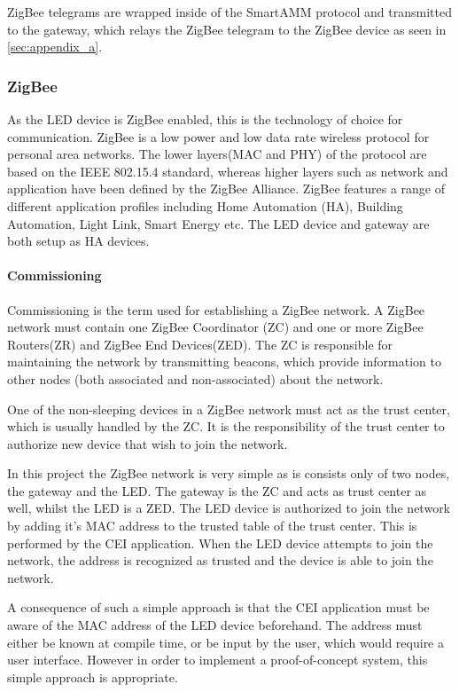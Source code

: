 \documentclass[Main]{subfiles}
\begin{document}
			ZigBee telegrams are wrapped inside of the SmartAMM protocol and transmitted to the gateway, which relays the ZigBee telegram to the ZigBee device as seen in \ref{sec:appendix_a}.


		\subsubsection{ZigBee}
			As the LED device is ZigBee enabled, this is the technology of choice for communication. 
			ZigBee is a low power and low data rate wireless protocol for personal area networks. 
			The lower layers(MAC and PHY) of the protocol are based on the IEEE 802.15.4 standard\cite{ZigBeeSpec}, whereas higher layers such as network and application have been defined by the ZigBee Alliance.
			ZigBee features a range of different application profiles including Home Automation (HA), Building Automation, Light Link, Smart Energy etc\cite{ZigBeeApplicationProfiles:Online}.
			The LED device and gateway are both setup as HA devices. 

			\paragraph{Commissioning} %
				Commissioning is the term used for establishing a ZigBee network.
				A ZigBee network must contain one ZigBee Coordinator (ZC) and one or more ZigBee Routers(ZR) and ZigBee End Devices(ZED). 
				The ZC is responsible for maintaining the network by transmitting beacons, which provide information to other nodes (both associated and non-associated) about the network.

				One of the non-sleeping devices in a ZigBee network must act as the trust center, which is usually handled by the ZC. 
				It is the responsibility of the trust center to authorize new device that wish to join the network.

				In this project the ZigBee network is very simple as is consists only of two nodes, the gateway and the LED. 
				The gateway is the ZC and acts as trust center as well, whilst the LED is a ZED.
				The LED device is authorized to join the network by adding it's MAC address to the trusted table of the trust center. 
				This is performed by the CEI application.
				When the LED device attempts to join the network, the address is recognized as trusted and the device is able to join the network. 

				A consequence of such a simple approach is that the CEI application must be aware of the MAC address of the LED device beforehand. 
				The address must either be known at compile time, or be input by the user, which would require a user interface. 
				However in order to implement a proof-of-concept system, this simple approach is appropriate. 			
			\label{par:commissioning}
			
\end{document}
